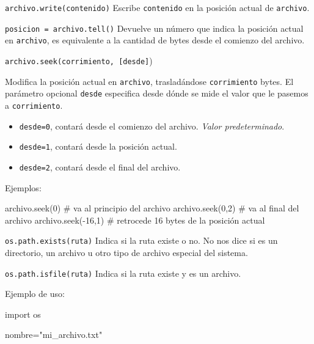 \begin{referencia_python}
\begin{sintaxis}{\lstinline!archivo.write(contenido)!}
Escribe \lstinline!contenido! en la posición actual de \lstinline!archivo!.
\end{sintaxis}

\begin{sintaxis}{\lstinline!posicion = archivo.tell()!}
Devuelve un número que indica la posición actual en \lstinline!archivo!, es
equivalente a la cantidad de bytes desde el comienzo del archivo.
\end{sintaxis}

\begin{sintaxis}{\lstinline!archivo.seek(corrimiento, [desde]!)}

Modifica la posición actual en \lstinline!archivo!, trasladándose
\lstinline!corrimiento! bytes.  El parámetro opcional \lstinline!desde!
especifica desde dónde se mide el valor que le pasemos a
\lstinline!corrimiento!.

\begin{itemize}
\item \lstinline!desde=0!, contará desde el comienzo del archivo. \textit{Valor
predeterminado}.
\item \lstinline!desde=1!, contará desde la posición actual.
\item \lstinline!desde=2!, contará desde el final del archivo.
\end{itemize}

Ejemplos:
\begin{codigo-python-sn}
archivo.seek(0)     # va al principio del archivo
archivo.seek(0,2)   # va al final del archivo
archivo.seek(-16,1) # retrocede 16 bytes de la posición actual
\end{codigo-python-sn}

\end{sintaxis}

\begin{sintaxis}{\lstinline!os.path.exists(ruta)!}
Indica si la ruta existe o no.
No nos dice si es un directorio, un archivo u otro tipo de archivo especial
del sistema.
\end{sintaxis}

\begin{sintaxis}{\lstinline!os.path.isfile(ruta)!}
Indica si la ruta existe y es un archivo.

Ejemplo de uso:
\begin{codigo-python}
import os

nombre="mi_archivo.txt"


\end{codigo-python}
\end{sintaxis}
\end{referencia_python}
